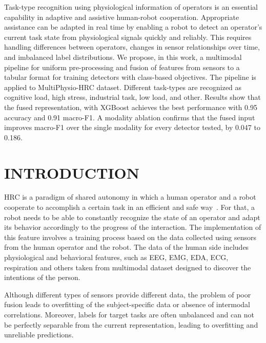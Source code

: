 \documentclass[a4paper,twoside]{article}
\begin{document}
{    Task-type recognition using physiological information of operators is an essential capability in adaptive and assistive human-robot cooperation. Appropriate assistance can be adapted in real time by enabling a robot to detect an operator’s current task state from physiological signals quickly and reliably. This requires handling differences between operators, changes in sensor relationships over time, and imbalanced label distributions. We propose, in this work, a multimodal pipeline for uniform pre-processing and fusion of features from sensors to a tabular format for training detectors with class-based objectives. The pipeline is applied to MultiPhysio-HRC dataset. Different task-types are recognized as cognitive load, high stress, industrial task, low load, and other. Results show that the fused representation, with \acs{XGBoost} achieves the best performance with 0.95 accuracy and 0.91 macro-F1. A modality ablation confirms that the fused input improves macro-F1 over the single modality for every detector tested, by 0.047 to 0.186.}

\onecolumn \maketitle \normalsize \setcounter{footnote}{0} \acresetall

\section{\uppercase{Introduction}}\label{sec:introduction}

\noindent \ac{HRC} is a paradigm of shared autonomy in which a human operator and a robot cooperate to accomplish a certain task in an efficient and safe way~\cite{selvaggio2021autonomy,borghi2025operatorstress}. For that, a robot needs to be able to constantly recognize the state of an operator and adapt its behavior accordingly to the progress of the interaction. The implementation of this feature involves a training process based on the data collected using sensors from the human operator and the robot. The data of the human side includes physiological and behavioral features, such as \ac{EEG}, \ac{EMG}, \ac{EDA}, \ac{ECG}, respiration and others taken from multimodal dataset designed to discover the intentions of the person.

Although different types of sensors provide different data, the problem of poor fusion leads to overfitting of the subject-specific data or absence of intermodal correlations. Moreover, labels for target tasks are often unbalanced and can not be perfectly separable from the current representation, leading to overfitting and unreliable predictions.
\end{document}

